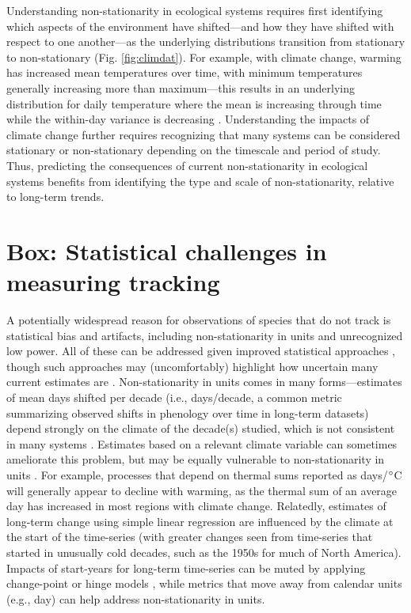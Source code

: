 \documentclass[11pt,letterpaper]{article}
\begin{document}
Understanding non-stationarity in ecological systems requires first identifying which aspects of the environment have shifted---and how they have shifted with respect to one another---as the underlying  distributions transition from stationary to non-stationary (Fig. \ref{fig:climdat}). For example, with climate change, warming has increased mean temperatures over time, with minimum temperatures generally increasing more than maximum---this results in an underlying distribution for daily temperature where the mean is increasing through time while the within-day variance is decreasing \citep{ipcc2013,screen2014}. Understanding the impacts of climate change further requires recognizing that many systems can be considered stationary or non-stationary depending on the timescale and period of study. Thus, predicting the consequences of current non-stationarity in ecological systems benefits from identifying the type and scale of non-stationarity, relative to long-term trends. 

\section{Box: Statistical challenges in measuring tracking} %
A potentially widespread reason for observations of species that do not track is statistical bias and artifacts, including non-stationarity in units and unrecognized low power. All of these can be addressed given improved statistical approaches \citep[e.g.,][]{gienapp2005,pearse2017}, though such approaches may (uncomfortably) highlight how uncertain many current estimates are \citep{brown2016}. Non-stationarity in units comes in many forms---estimates of mean days shifted per decade (i.e., days/decade, a common metric summarizing observed shifts in phenology over time in long-term datasets) depend strongly on the climate of the decade(s) studied, which is not consistent in many systems \citep{Ault2011,McCabe2012}. Estimates based on a relevant climate variable can sometimes ameliorate this problem, but may be equally vulnerable to non-stationarity in units \citep[e.g.,][]{Sagarin:2001fu}. For example, processes that depend on thermal sums reported as days/$\degree$C will generally appear to decline with warming, as the thermal sum of an average day has increased in most regions with climate change. Relatedly, estimates of long-term change using simple linear regression are influenced by the climate at the start of the time-series (with greater changes seen from time-series that started in unusually cold decades, such as the 1950s for much of North America). Impacts of start-years for long-term time-series can be muted by applying change-point or hinge models \citep[e.g.,][]{kharouba2018}, while metrics that move away from calendar units (e.g., day) can help address non-stationarity in units. 
\end{document}
